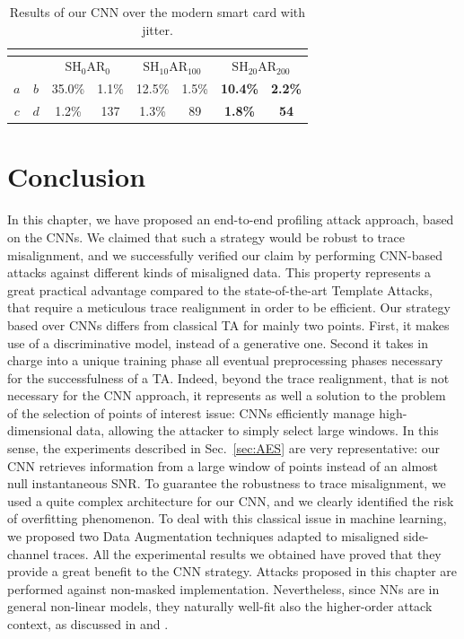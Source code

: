     \centering

\begin{table}
\begin{tabular}{|c|c|c|c|c|c|c|c|}
\multicolumn{8}{c}{}\\
\hline
\multicolumn{2}{|c|}{} & \multicolumn{2}{c|}{$\mathrm{SH}_{0}\mathrm{AR}_{0}$} & \multicolumn{2}{c|}{$\mathrm{SH}_{10}\mathrm{AR}_{100}$} & \multicolumn{2}{c|}{$\mathrm{SH}_{20}\mathrm{AR}_{200}$} \\ \hline
$a$        & $b$       & 35.0\%                     & 1.1\%                    & 12.5\%                      & 1.5\%                      & \textbf{10.4\%}             & \textbf{2.2\%}             \\ \hline
$c$        & $d$       & 1.2\%                      & 137                      & 1.3\%                       & 89                         & \textbf{1.8\%}              & \textbf{54}                \\ \hline
\end{tabular}

\caption{Results of our CNN over the modern smart card with jitter.}\label{tab:res_AES}
\end{table}

  
 \section{Conclusion}
In this chapter, we have proposed an end-to-end profiling attack approach, based on the CNNs. We claimed that such a strategy would be robust to trace misalignment, and we successfully verified our claim by performing CNN-based attacks against different kinds of misaligned data. This property represents a great practical advantage compared to the state-of-the-art Template Attacks, that require a meticulous trace realignment in order to be efficient. Our strategy based over CNNs differs from classical TA for mainly two points. First, it makes use of a discriminative model, instead of a generative one. Second it takes in charge into a unique training phase all eventual preprocessing phases necessary for the successfulness of a TA. Indeed, beyond the trace realignment, that is not necessary for the CNN approach, it represents as well a solution to the problem of the selection of points of interest issue: CNNs efficiently manage high-dimensional data, allowing the attacker to simply  select large windows. In this sense, the experiments described in Sec.~\ref{sec:AES} are very representative: our CNN retrieves information from a large window of points instead of an almost null instantaneous SNR. To guarantee the robustness to trace misalignment, we used a quite complex architecture for our CNN, and we clearly identified the risk of overfitting phenomenon. To deal with this classical issue in machine learning, we proposed two Data Augmentation techniques adapted to misaligned side-channel traces. All the experimental results we obtained have proved that they provide a great benefit to the CNN strategy.  Attacks proposed in this chapter are performed against non-masked implementation. Nevertheless, since NNs are in general non-linear models, they naturally well-fit also the higher-order attack context, as discussed in \cite{maghrebi2016breaking} and \cite{DLwhitepaper}.
